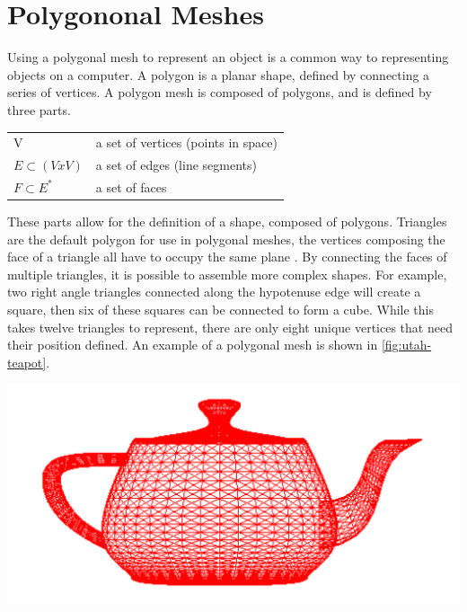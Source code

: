 \documentclass[10pt]{report}
\begin{document}
		\section{Polygononal Meshes}
	
		Using a polygonal mesh to represent an object is a common way to representing objects on a computer. A polygon is a planar shape, defined by connecting a series of vertices. A polygon mesh is composed of polygons, and is defined by three parts.
		
		\begin{center}
			\begin{tabular}{ l l } 
				V & a set of vertices (points in space)\\ 
				$E {\subset} (V x V)$ & a set of edges (line segments)\\ 
				$F {\subset} E^{\ast}$  & a set of faces \\
			\end{tabular}
		\end{center}
	
		These parts allow for the definition of a shape, composed of polygons. Triangles are the default polygon for use in polygonal meshes, the vertices composing the face of a triangle all have to occupy the same plane \cite{polygon}. By connecting the faces of multiple triangles, it is possible to assemble more complex shapes. For example, two right angle triangles connected along the hypotenuse edge will create a square, then six of these squares can be connected to form a cube. While this takes twelve triangles to represent, there are only eight unique vertices that need their position defined. An example of a polygonal mesh is shown in \autoref{fig:utah-teapot}.
		
		\begin{minipage}{\textwidth}
			\centering
			\includegraphics[scale=0.3]{utah-teapot}
			\label{fig:utah-teapot}
		\end{minipage}	
		
\end{document}
